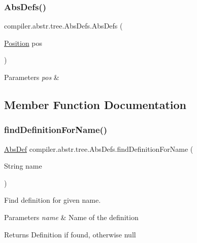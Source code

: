 \subsubsection{\texorpdfstring{Abs\+Defs()}{AbsDefs()}\hspace{0.1cm}{\footnotesize\ttfamily [2/2]}}
{\footnotesize\ttfamily compiler.\+abstr.\+tree.\+Abs\+Defs.\+Abs\+Defs (\begin{DoxyParamCaption}\item[{\hyperlink{classcompiler_1_1_position}{Position}}]{pos }\end{DoxyParamCaption})}


\begin{DoxyParams}{Parameters}
{\em pos} & \\
\hline
\end{DoxyParams}


\subsection{Member Function Documentation}
\mbox{\label{classcompiler_1_1abstr_1_1tree_1_1_abs_defs_ab987f889df19003f210cbe618732079c}} 
\subsubsection{\texorpdfstring{find\+Definition\+For\+Name()}{findDefinitionForName()}}
{\footnotesize\ttfamily \hyperlink{classcompiler_1_1abstr_1_1tree_1_1def_1_1_abs_def}{Abs\+Def} compiler.\+abstr.\+tree.\+Abs\+Defs.\+find\+Definition\+For\+Name (\begin{DoxyParamCaption}\item[{String}]{name }\end{DoxyParamCaption})}

Find definition for given name. 
\begin{DoxyParams}{Parameters}
{\em name} & Name of the definition \\
\hline
\end{DoxyParams}
\begin{DoxyReturn}{Returns}
Definition if found, otherwise null 
\end{DoxyReturn}


